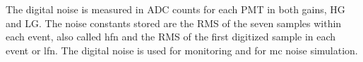 The digital noise is measured in ADC counts for each PMT in both gains, HG and
LG\@. The noise constants stored are the RMS of the seven samples within each
event, also called \gls{hfn} and the RMS of the first digitized sample in each
event or \gls{lfn}. The digital noise is used for monitoring and for \gls{mc}
noise simulation.
